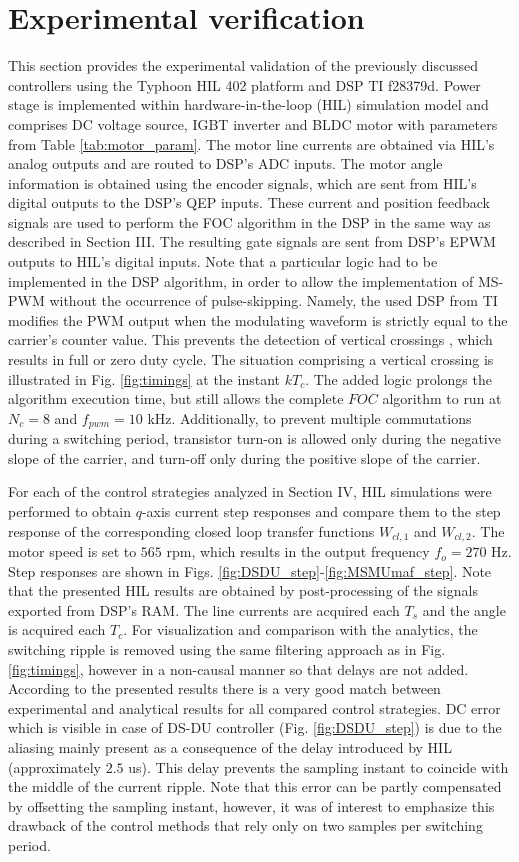 \documentclass[conference]{IEEEtran}
\begin{document}
\section{Experimental verification}
This section provides the experimental validation of the previously discussed controllers using the Typhoon HIL 402 platform and DSP TI f28379d. Power stage is implemented within hardware-in-the-loop (HIL) simulation model and comprises DC voltage source, IGBT inverter and BLDC motor with parameters from Table \ref{tab:motor_param}. The motor line currents are obtained via HIL’s analog outputs and are routed to DSP's ADC inputs. The motor angle information is obtained using the encoder signals, which are sent from HIL’s digital outputs to the DSP's QEP inputs. These current and position feedback signals are used to perform the FOC algorithm in the DSP in the same way as described in Section III. The resulting gate signals are sent from DSP’s EPWM outputs to HIL's digital inputs. 
Note that a particular logic had to be implemented in the DSP algorithm, in order to allow the implementation of MS-PWM without the occurrence of pulse-skipping. Namely, the used DSP from TI modifies the PWM output when the modulating waveform is strictly equal to the carrier's counter value. This prevents the detection of vertical crossings \cite{corradini2018}, which results in full or zero duty cycle. The situation comprising a vertical crossing is illustrated in Fig. \ref{fig:timings} at the instant $kT_c$.
The added logic prolongs the algorithm execution time, but still allows the complete $FOC$ algorithm to run at $N_c=8$ and $f_{pwm} = 10$ kHz. Additionally, to prevent multiple commutations during a switching period, transistor turn-on is allowed only during the negative slope of the carrier, and turn-off only during the positive slope of the carrier.

For each of the control strategies analyzed in Section IV, HIL simulations were performed to obtain $q$-axis current step responses and compare them to the step response of the corresponding closed loop transfer functions $W_{cl,1}$ and $W_{cl,2}$. The motor speed is set to $565$ rpm, which results in the output frequency $f_o=270$ Hz. 
Step responses are shown in Figs. \ref{fig:DSDU_step}-\ref{fig:MSMUmaf_step}. Note that the presented HIL results are obtained by post-processing of the signals exported from DSP’s RAM. The line currents are acquired each $T_s$ and the angle is acquired each $T_c$. 
For visualization and comparison with the analytics, the switching ripple is removed using the same filtering approach as in Fig. \ref{fig:timings}, however in a non-causal manner so that delays are not added.
According to the presented results there is a very good match between experimental and analytical results for all compared control strategies. DC error which is visible in case of DS-DU controller (Fig. \ref{fig:DSDU_step}) is due to the aliasing mainly present as a consequence of the delay introduced by HIL (approximately $2.5$ us). This delay prevents the sampling instant to coincide with the middle of the current ripple. Note that this error can be partly compensated by offsetting the sampling instant, however, it was of interest to emphasize this drawback of the control methods that rely only on two samples per switching period. 
\end{document}

